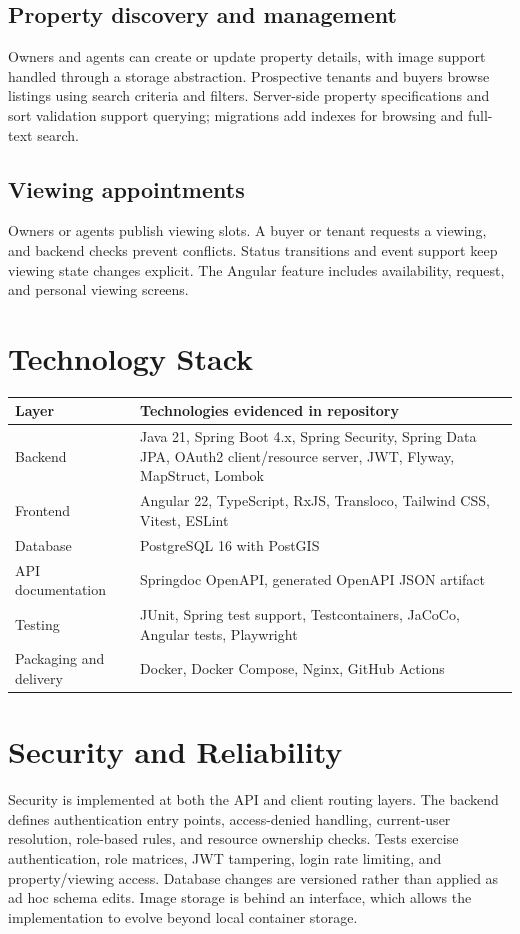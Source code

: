 \documentclass[11pt,a4paper]{article}
\begin{document}
\subsection{Property discovery and management}
Owners and agents can create or update property details, with image support handled through a storage abstraction. Prospective tenants and buyers browse listings using search criteria and filters. Server-side property specifications and sort validation support querying; migrations add indexes for browsing and full-text search.

\subsection{Viewing appointments}
Owners or agents publish viewing slots. A buyer or tenant requests a viewing, and backend checks prevent conflicts. Status transitions and event support keep viewing state changes explicit. The Angular feature includes availability, request, and personal viewing screens.

\section{Technology Stack}
\begin{tabularx}{\textwidth}{@{}p{}X@{}}
\toprule
Layer & Technologies evidenced in repository \\
\midrule
Backend & Java 21, Spring Boot 4.x, Spring Security, Spring Data JPA, OAuth2 client/resource server, JWT, Flyway, MapStruct, Lombok \\
Frontend & Angular 22, TypeScript, RxJS, Transloco, Tailwind CSS, Vitest, ESLint \\
Database & PostgreSQL 16 with PostGIS \\
API documentation & Springdoc OpenAPI, generated OpenAPI JSON artifact \\
Testing & JUnit, Spring test support, Testcontainers, JaCoCo, Angular tests, Playwright \\
Packaging and delivery & Docker, Docker Compose, Nginx, GitHub Actions \\
\bottomrule
\end{tabularx}



\section{Security and Reliability}
Security is implemented at both the API and client routing layers. The backend defines authentication entry points, access-denied handling, current-user resolution, role-based rules, and resource ownership checks. Tests exercise authentication, role matrices, JWT tampering, login rate limiting, and property/viewing access. Database changes are versioned rather than applied as ad hoc schema edits. Image storage is behind an interface, which allows the implementation to evolve beyond local container storage.
\end{document}
